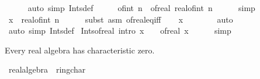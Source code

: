\begin{isabellebody}
\ \ \ \ \isamarkupfalse%
\ {\isacharparenleft}{\kern0pt}auto\ simp{\isacharcolon}{\kern0pt}\ Ints{\isacharunderscore}{\kern0pt}def{\isacharparenright}{\kern0pt}\isanewline
\ \ \isamarkupfalse%
\ \isamarkupfalse%
\ {\isachardoublequoteopen}of{\isacharunderscore}{\kern0pt}int\ n\ {\isacharequal}{\kern0pt}\ of{\isacharunderscore}{\kern0pt}real\ {\isacharparenleft}{\kern0pt}real{\isacharunderscore}{\kern0pt}of{\isacharunderscore}{\kern0pt}int\ n{\isacharparenright}{\kern0pt}{\isachardoublequoteclose}\isanewline
\ \ \ \ \isamarkupfalse%
\ simp\isanewline
\ \ \isamarkupfalse%
\ \isamarkupfalse%
\ {\isachardoublequoteopen}x\ {\isacharequal}{\kern0pt}\ real{\isacharunderscore}{\kern0pt}of{\isacharunderscore}{\kern0pt}int\ n{\isachardoublequoteclose}\isanewline
\ \ \ \ \isamarkupfalse%
\ {\isacharparenleft}{\kern0pt}subst\ {\isacharparenleft}{\kern0pt}asm{\isacharparenright}{\kern0pt}\ of{\isacharunderscore}{\kern0pt}real{\isacharunderscore}{\kern0pt}eq{\isacharunderscore}{\kern0pt}iff{\isacharparenright}{\kern0pt}\isanewline
\ \ \isamarkupfalse%
\ {\isachardoublequoteopen}x\ {\isasymin}\ {\isasymint}{\isachardoublequoteclose}\isanewline
\ \ \ \ \isamarkupfalse%
\ auto\isanewline
{}\isamarkupfalse%
\ {\isacharparenleft}{\kern0pt}auto\ simp{\isacharcolon}{\kern0pt}\ Ints{\isacharunderscore}{\kern0pt}def{\isacharparenright}{\kern0pt}%
\endisatagproof
{\isafoldproof}%
%
\isadelimproof
\isanewline
%
\endisadelimproof
\isanewline
{}\isamarkupfalse%
\ Ints{\isacharunderscore}{\kern0pt}of{\isacharunderscore}{\kern0pt}real\ {\isacharbrackleft}{\kern0pt}intro{\isacharbrackright}{\kern0pt}{\isacharcolon}{\kern0pt}\ {\isachardoublequoteopen}x\ {\isasymin}\ {\isasymint}\ {\isasymLongrightarrow}\ of{\isacharunderscore}{\kern0pt}real\ x\ {\isasymin}\ {\isasymint}{\isachardoublequoteclose}\isanewline
%
\isadelimproof
\ \ %
\endisadelimproof
%
\isatagproof
{}\isamarkupfalse%
\ simp%
\endisatagproof
{\isafoldproof}%
%
\isadelimproof
%
\endisadelimproof
%
\begin{isamarkuptext}%
Every real algebra has characteristic zero.%
\end{isamarkuptext}\isamarkuptrue%
\isamarkupfalse%
\ real{\isacharunderscore}{\kern0pt}algebra{\isacharunderscore}{\kern0pt}{}\ {\isacharless}{\kern0pt}\ ring{\isacharunderscore}{\kern0pt}char{\isacharunderscore}{\kern0pt}{}\isanewline
%
\isadelimproof

\end{isabellebody}
